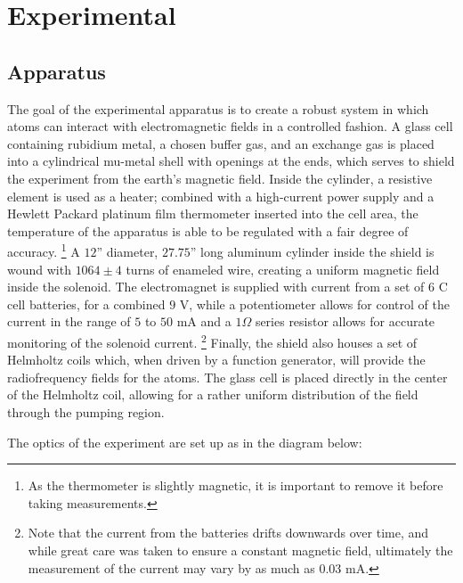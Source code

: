 
\section{Experimental}\label{experimental}

\subsection{Apparatus}\label{apparatus}

The goal of the experimental apparatus is to create a robust system in which atoms can interact with electromagnetic fields in a controlled fashion. A glass cell containing rubidium metal, a chosen buffer gas, and an exchange gas is placed into a cylindrical mu-metal shell with openings at the ends, which serves to shield the experiment from the earth's magnetic field. Inside the cylinder, a resistive element is used as a heater; combined with a high-current power supply and a Hewlett Packard platinum film thermometer inserted into the cell area, the temperature of the apparatus is able to be regulated with a fair degree of accuracy. \footnote{As the thermometer is slightly magnetic, it is important to remove it before taking measurements.} A $12$'' diameter, $27.75$'' long aluminum cylinder inside the shield is wound with $1064\pm4$ turns of enameled wire, creating a uniform magnetic field inside the solenoid. The electromagnet is supplied with current from a set of $6$ C cell batteries, for a combined $9$ V, while a potentiometer allows for control of the current in the range of $5$ to $50$ mA and a $1 \Omega$ series resistor allows for accurate monitoring of the solenoid current. \footnote{Note that the current from the batteries drifts downwards over time, and while great care was taken to ensure a constant magnetic field, ultimately the measurement of the current may vary by as much as $0.03$ mA.} Finally, the shield also houses a set of Helmholtz coils which, when driven by a function generator, will provide the radiofrequency fields for the atoms. The glass cell is placed directly in the center of the Helmholtz coil, allowing for a rather uniform distribution of the field through the pumping region.

The optics of the experiment are set up as in the diagram below: 

